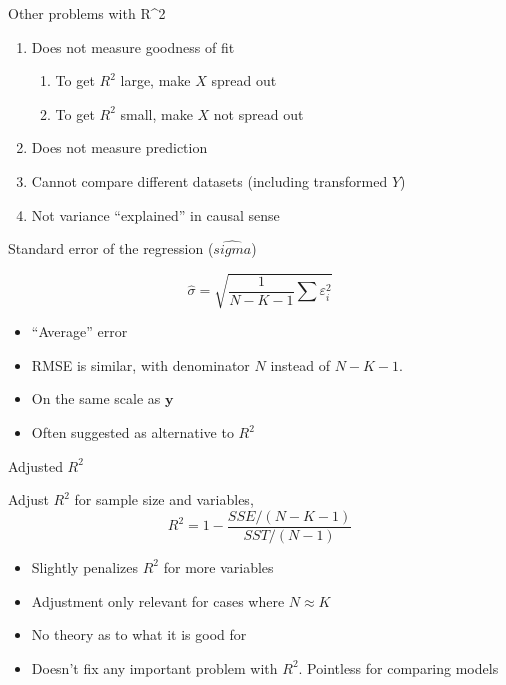 \documentclass[ignorenonframetext,]{beamer}
\providecommand{\tightlist}{%
  \setlength{\itemsep}{0pt}\setlength{\parskip}{0pt}}
\renewcommand{\vec}[1]{\boldsymbol{#1}}
\begin{document}
\begin{frame}{Other problems with R\^{}2}

\begin{enumerate}[<+->]
\def\labelenumi{\arabic{enumi}.}
\tightlist
\item
  Does not measure goodness of fit

  \begin{enumerate}[<+->]
  \def\labelenumii{\arabic{enumii}.}
  \tightlist
  \item
    To get \(R^2\) large, make \(X\) spread out
  \item
    To get \(R^2\) small, make \(X\) not spread out
  \end{enumerate}
\item
  Does not measure prediction
\item
  Cannot compare different datasets (including transformed \(Y\))
\item
  Not variance ``explained'' in causal sense
\end{enumerate}

\end{frame}

\begin{frame}{Standard error of the regression (\(\hat{sigma}\))}

\[
\hat{\sigma} = \sqrt{ \frac{1}{N - K - 1} \sum \varepsilon_i^2 }
\]

\begin{itemize}[<+->]
\tightlist
\item
  ``Average'' error
\item
  RMSE is similar, with denominator \(N\) instead of \(N - K - 1\).
\item
  On the same scale as \(\vec{y}\)
\item
  Often suggested as alternative to \(R^2\)
\end{itemize}

\end{frame}

\begin{frame}{Adjusted \(R^2\)}

Adjust \(R^2\) for sample size and variables, \[
R^2 = 1 - \frac{SSE / (N - K - 1)}{SST / (N - 1)}
\]

\begin{itemize}[<+->]
\tightlist
\item
  Slightly penalizes \(R^2\) for more variables
\item
  Adjustment only relevant for cases where \(N \approx K\)
\item
  No theory as to what it is good for
\item
  Doesn't fix any important problem with \(R^2\). Pointless for
  comparing models
\end{itemize}

\end{frame}
\end{document}
